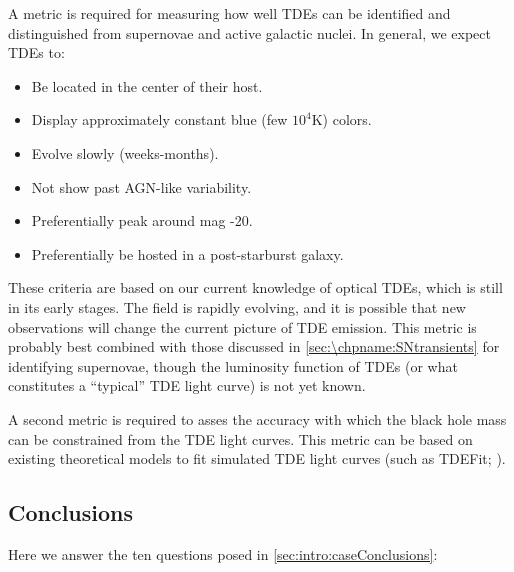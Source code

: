 A metric is required for measuring how well TDEs can be identified and
distinguished from supernovae and active galactic nuclei. In general, we
expect TDEs to:
\begin{itemize}
\item Be located in the center of their host.
\item Display approximately constant blue (few $10^4$K) colors.
\item Evolve slowly (weeks-months).
\item Not show past AGN-like variability.
\item Preferentially peak around mag -20.
\item Preferentially be hosted in a post-starburst galaxy.
\end{itemize}
These criteria are based on our current knowledge of optical TDEs, which
is still in its early stages. The field is rapidly evolving, and it is
possible that new observations will change the current picture of TDE
emission. This metric is probably best combined with those discussed in
 \autoref{sec:\chpname:SNtransients} for identifying supernovae, though the
luminosity function of TDEs (or what constitutes a ``typical'' TDE light
curve) is not yet known.

A second metric is required to asses the accuracy with which the black
hole mass can be constrained from the TDE light curves. This metric can
be based on existing theoretical models to fit simulated TDE light
curves (such as TDEFit; \citealt{Guillochon2014}).

%
 \subsection{Conclusions}

 Here we answer the ten questions posed in
 \autoref{sec:intro:caseConclusions}:

